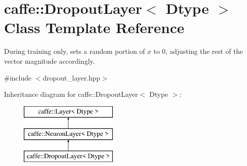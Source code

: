 \hypertarget{classcaffe_1_1DropoutLayer}{}\section{caffe\+:\+:Dropout\+Layer$<$ Dtype $>$ Class Template Reference}
\label{classcaffe_1_1DropoutLayer}


During training only, sets a random portion of $x$ to 0, adjusting the rest of the vector magnitude accordingly.  




{\ttfamily \#include $<$dropout\+\_\+layer.\+hpp$>$}

Inheritance diagram for caffe\+:\+:Dropout\+Layer$<$ Dtype $>$\+:\begin{figure}[H]
\begin{center}
\leavevmode
\includegraphics[height=3.000000cm]{classcaffe_1_1DropoutLayer}
\end{center}
\end{figure}
